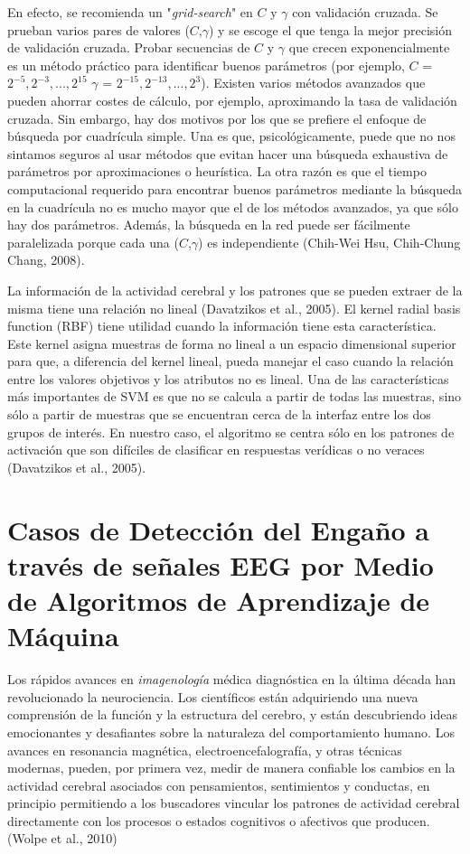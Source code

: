 En efecto, se recomienda un "\textit{grid-search}" en $C$ y $\gamma$ con validación cruzada.  Se prueban varios pares de valores ($C$,$\gamma$) y se escoge el que tenga la mejor precisión de validación cruzada. Probar secuencias de $C$ y $\gamma$ que crecen exponencialmente es un método práctico para identificar buenos parámetros (por ejemplo, $C$ = $2^{-5}, 2^{-3}, ..., 2^{15}$ $\gamma$ = $2^{-15}, 2^{-13},..., 2^{3}$). Existen varios métodos avanzados que pueden ahorrar costes de cálculo, por ejemplo, aproximando la tasa de validación cruzada. Sin embargo, hay dos motivos por los que se prefiere el enfoque de búsqueda por cuadrícula simple. Una es que, psicológicamente, puede que no nos sintamos seguros al usar métodos que evitan hacer una búsqueda exhaustiva de parámetros por aproximaciones o heurística.   La otra razón es que el tiempo computacional requerido para encontrar buenos parámetros mediante la búsqueda en la cuadrícula no es mucho mayor que el de los métodos avanzados, ya que sólo hay dos parámetros. Además, la búsqueda en la red puede ser fácilmente paralelizada porque cada una ($C$,$\gamma$) es independiente (Chih-Wei Hsu, Chih-Chung Chang, 2008).

La información de la actividad cerebral y los patrones que se pueden extraer de la misma tiene una relación no lineal (Davatzikos et al., 2005). El kernel radial basis function (RBF) tiene utilidad cuando la información tiene esta característica. Este kernel asigna muestras de forma no lineal a un espacio dimensional superior para que, a diferencia del kernel lineal, pueda manejar el caso cuando la relación entre los valores objetivos y los atributos no es lineal. Una de las características más importantes de SVM es que no se calcula a partir de todas las muestras, sino sólo a partir de muestras que se encuentran cerca de la interfaz entre los dos grupos de interés. En nuestro caso, el algoritmo se centra sólo en los patrones de activación que son difíciles de clasificar en respuestas verídicas o no veraces (Davatzikos et al., 2005).

\section{Casos de Detección del Engaño a través de señales EEG por Medio de Algoritmos de Aprendizaje de Máquina}
Los rápidos avances en \textit{imagenología} médica diagnóstica en la última década han revolucionado la neurociencia. Los científicos están adquiriendo una nueva comprensión de la función y la estructura del cerebro, y están descubriendo ideas emocionantes y desafiantes sobre la naturaleza del comportamiento humano. Los avances en resonancia magnética, electroencefalografía, y otras técnicas modernas, pueden, por primera vez, medir de manera confiable los cambios en la actividad cerebral asociados con pensamientos, sentimientos y conductas, en principio permitiendo a los buscadores vincular los patrones de actividad cerebral directamente con los procesos o estados cognitivos o afectivos que producen. (Wolpe et al., 2010)

